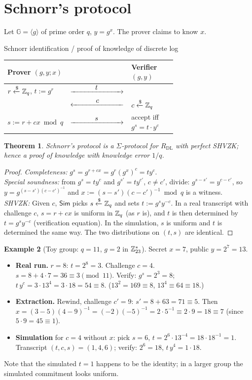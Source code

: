 \documentclass[11pt,a4paper]{report}
\makeatletter
\theoremstyle{plain}
\newtheorem{theorem}{Theorem}[chapter]
\theoremstyle{definition}
\newtheorem{example}[theorem]{Example}
\theoremstyle{remark}
\newcommand{\GG}{\mathbb{G}}
\newcommand{\getsr}{\xleftarrow{\$}}
\newcommand{\Sim}{\mathsf{Sim}}\newcommand{\Ext}{\mathsf{Ext}}
\newcommand{\ra}[1]{\xrightarrow{\makebox[2.5cm]{$#1$}}}
\newcommand{\la}[1]{\xleftarrow{\makebox[2.5cm]{$#1$}}}
\newcommand{\inv}{^{-1}}
\newcommand{\Zs}[1]{\ZZ_{#1}^{*}}
\newenvironment{flow}[2]{%
  \par\smallskip\noindent
  \begin{tabular}{@{}L{0.34\linewidth} c L{0.34\linewidth}@{}}
  \textbf{#1} & & \textbf{#2}\\ \hline}{\end{tabular}\par\smallskip}
\makeatother
\begin{document}
\section{Schnorr's protocol}
\label{sec:schnorr}
Let $\GG=\langle g\rangle$ of prime order $q$, $y=g^x$. The prover claims to know $x$.
\begin{protocol}[label=pr:schnorr]{Schnorr identification / proof of knowledge of discrete log}
\begin{flow}{Prover $(g,y;x)$}{Verifier $(g,y)$}
$r\getsr\ZZ_q$, $t:=g^r$ & $\ra{t}$ & \\
 & $\la{c}$ & $c\getsr\ZZ_q$\\
$s:=r+cx\bmod q$ & $\ra{s}$ & accept iff $g^s=t\cdot y^c$
\end{flow}
\end{protocol}
\begin{theorem}\label{thm:schnorr}
Schnorr's protocol is a $\Sigma$-protocol for $R_{\mathrm{DL}}$ with perfect SHVZK; hence a proof of knowledge with knowledge error $1/q$.
\end{theorem}
\begin{proof}
\emph{Completeness:} $g^s=g^{r+cx}=g^r(g^x)^c=ty^c$.\\
\emph{Special soundness:} from $g^s=ty^c$ and $g^{s'}=ty^{c'}$, $c\ne c'$, divide: $g^{s-s'}=y^{c-c'}$, so $y=g^{(s-s')(c-c')\inv}$ and $x:=(s-s')(c-c')\inv\bmod q$ is a witness.\\
\emph{SHVZK:} Given $c$, $\Sim$ picks $s\getsr\ZZ_q$ and sets $t:=g^sy^{-c}$. In a real transcript with challenge $c$, $s=r+cx$ is uniform in $\mathbb{Z}_q$ (as $r$ is), and $t$ is then determined by $t=g^sy^{-c}$ (verification equation). In the simulation, $s$ is uniform and $t$ is determined the same way. The two distributions on $(t,s)$ are identical.
\end{proof}
\begin{example}[Toy group: $q=11$, $g=2$ in $\Zs{23}$]\label{ex:schnorr}
Secret $x=7$, public $y=2^7=13$.
\begin{itemize}
\item \textbf{Real run.} $r=8$: $t=2^8=3$. Challenge $c=4$. $s=8+4\cdot7=36\equiv3\pmod{11}$. Verify: $g^s=2^3=8$; $t\,y^c=3\cdot13^4=3\cdot18=54\equiv8$. \checkmark ($13^2=169\equiv8$, $13^4\equiv64\equiv18$.)
\item \textbf{Extraction.} Rewind, challenge $c'=9$: $s'=8+63=71\equiv5$. Then $x=(3-5)(4-9)\inv=(-2)(-5)\inv=2\cdot5\inv\equiv2\cdot9=18\equiv7$ (since $5\cdot9=45\equiv1$). \checkmark
\item \textbf{Simulation} for $c=4$ without $x$: pick $s=6$, $t=2^6\cdot13^{-4}=18\cdot18\inv=1$. Transcript $(t,c,s)=(1,4,6)$; verify: $2^6=18$, $t\,y^4=1\cdot18$. \checkmark
\end{itemize}
Note that the simulated $t=1$ happens to be the identity; in a larger group the simulated commitment looks uniform.
\end{example}
\end{document}
